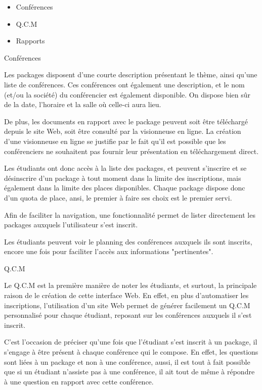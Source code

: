     \begin{itemize}
    \item Conférences
    \item Q.C.M
    \item Rapports
    \end{itemize}

    Conférences

    Les packages disposent d'une courte description présentant le thème, ainsi qu'une liste de conférences.
    Ces conférences ont également une description, et le nom (et/ou la société) du conférencier est également disponible.
    On dispose bien sûr de la date, l'horaire et la salle où celle-ci aura lieu.

    De plus, les documents en rapport avec le package peuvent soit être téléchargé depuis le site Web,
    soit être consulté par la visionneuse en ligne. La création d'une visionneuse en ligne se justifie par le fait
    qu'il est possible que les conférenciers ne souhaitent pas fournir leur présentation en téléchargement direct.

    Les étudiants ont donc accès à la liste des packages, et peuvent s'inscrire et se désinscrire
    d'un package à tout moment dans la limite des inscriptions, mais également dans la limite des places disponibles.
    Chaque package dispose donc d'un quota de place, ansi, le premier à faire ses choix est le premier servi.

    Afin de faciliter la navigation, une fonctionnalité permet de lister directement les packages auxquels l'utilisateur
    s'est inscrit.

    Les étudiants peuvent voir le planning des conférences auxquels ils sont inscrits, encore une fois pour faciliter l'accès
    aux informations "pertinentes".

    Q.C.M

    Le Q.C.M est la première manière de noter les étudiants, et surtout, la principale raison de le création de cette interface Web.
    En effet, en plus d'automatiser les inscriptions, l'utilisation d'un site Web permet de générer facilement un Q.C.M
    personnalisé pour chaque étudiant, reposant sur les conférences auxquels il s'est inscrit.

    C'est l'occasion de préciser qu'une fois que l'étudiant s'est inscrit à un package, il s'engage à être présent à chaque
    conférence qui le compose. En effet, les questions sont liées à un package et non à une conférence, aussi, il est tout à fait
    possible que si un étudiant n'assiste pas à une conférence, il ait tout de même à répondre à une question en rapport avec cette
    conférence.

